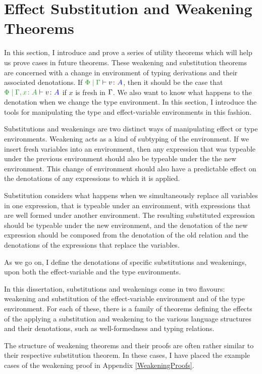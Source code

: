 \section{Effect Substitution and Weakening Theorems}\label{SubsAndWeakening}


In this section, I introduce and prove a series of utility theorems which will help us prove cases in future theorems. These weakening and substitution theorems are concerned with a change in environment of typing derivations and their associated denotations. If $\gpetyperelation{v}{A}$, then it should be the case that $\etyperelation{\P}{\gax}{v}{A}$ if $x$ is fresh in $\Gamma$. We also want to know what happens to the denotation when we change the type environment. In this section, I introduce the tools for manipulating the type and effect-variable environments in this fashion.

Substitutions and weakenings are two distinct ways of manipulating effect or type environments. Weakening acts as a kind of subtyping of the environment. If we insert fresh variables into an environment, then any expression that was typeable under the previous environment should also be typeable under the the new environment. This change of environment should also have a predictable effect on the denotations of any expressions to which it is applied.

Substitution considers what happens when we simultaneously replace all variables in one expression, that is typeable under an environment, with expressions that are well formed under another environment. The resulting substituted expression should be typeable under the new environment, and the denotation of the new expression should be composed from the denotation of the old relation and the denotations of the expressions that replace the variables. 

As we go on, I define the denotations of specific substitutions and weakenings, upon both the effect-variable and the type environments.

In this dissertation, substitutions and weakenings come in two flavours: weakening and substitution of the effect-variable environment and of the type environment. For each of these, there is a family of theorems defining the effects of the applying a substitution and weakening to the various language structures and their denotations, such as well-formedness and typing relations.

\begin{framed}
    \begin{aside}
        The structure of weakening theorems and their proofs are often rather similar to their respective substitution theorem. In these cases, I have placed the example cases of the weakening proof in Appendix \ref{WeakeningProofs}.
    \end{aside}
\end{framed}

